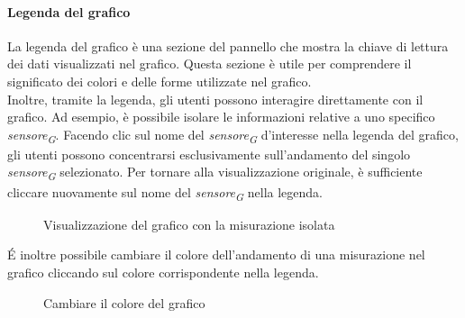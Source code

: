 \paragraph{Legenda del grafico}
La legenda del grafico è una sezione del pannello che mostra la chiave di lettura dei dati visualizzati nel grafico. Questa sezione è utile per comprendere il significato dei colori e delle forme utilizzate nel grafico. \\
Inoltre, tramite la legenda, gli utenti possono interagire direttamente con il grafico. Ad esempio, è possibile isolare le informazioni relative a uno specifico \textit{sensore}\textsubscript{\textit{G}}. Facendo clic sul nome del \textit{sensore}\textsubscript{\textit{G}} d'interesse nella legenda del grafico, gli utenti possono concentrarsi esclusivamente sull'andamento del singolo \textit{sensore}\textsubscript{\textit{G}} selezionato. Per tornare alla visualizzazione originale, è sufficiente cliccare nuovamente sul nome del \textit{sensore}\textsubscript{\textit{G}} nella legenda.
\begin{figure}[H]
    \centering
    \caption{Visualizzazione del grafico con la misurazione isolata}
    \label{fig:my_label}
\end{figure}
É inoltre possibile cambiare il colore dell'andamento di una misurazione nel grafico cliccando sul colore corrispondente nella legenda.
\begin{figure}[H]
    \centering
    \caption{Cambiare il colore del grafico}
    \label{fig:my_label}
\end{figure}


